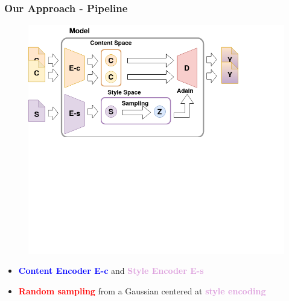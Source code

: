 \documentclass[11pt,xcolor=dvipsnames]{beamer}
\begin{document}
\begin{frame}
\frametitle{Our Approach - Pipeline}
\begin{figure}
\centering
\includegraphics[scale=0.3]{pipelinemodel.png}
\end{figure}


\begin{itemize}
	\item \textcolor{blue}{\textbf{Content Encoder E-c}} and \textcolor{Plum}{\textbf{Style Encoder E-s}}
	\vspace{10pt}
	\item \textcolor{red}{\textbf{Random sampling}} from a Gaussian centered at \textcolor{Plum}{\textbf{style encoding}}
	\vspace{10pt}
\end{itemize}

\end{frame}
\end{document}
